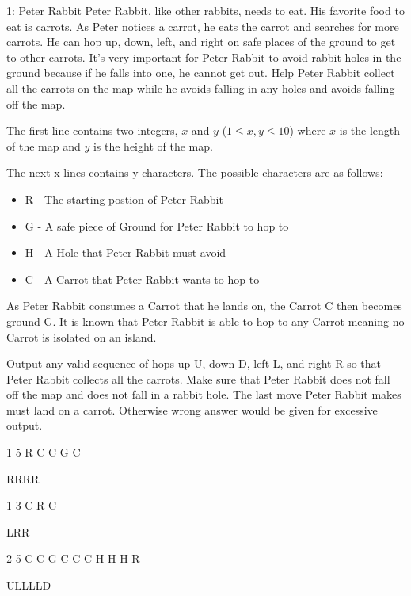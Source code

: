 \begin{problem}{1: Peter Rabbit}
Peter Rabbit, like other rabbits, needs to eat. His favorite food to eat is carrots.
As Peter notices a carrot, he eats the carrot and searches for more carrots.
He can hop up, down, left, and right on safe places of the ground to get to other carrots.
It's very important for Peter Rabbit to avoid rabbit holes in the ground because if he falls into one, he cannot get out.
Help Peter Rabbit collect all the carrots on the map while he avoids falling in any holes and avoids falling off the map.
\end{problem}

\begin{formalin}
The first line contains two integers, $x$ and $y$ ($1 \leq x, y \leq 10$) where $x$ is the length of the map and $y$ is the height of the map.

The next x lines contains y characters. The possible characters are as follows:
\begin{itemize}
\item R - The starting postion of Peter Rabbit
\item G - A safe piece of Ground for Peter Rabbit to hop to
\item H - A Hole that Peter Rabbit must avoid
\item C - A Carrot that Peter Rabbit wants to hop to
\end{itemize}

As Peter Rabbit consumes a Carrot that he lands on, the Carrot C then becomes ground G.
It is known that Peter Rabbit is able to hop to any Carrot meaning no Carrot is isolated on an island.
\end{formalin}

\begin{formalout}
Output any valid sequence of hops up U, down D, left L, and right R so that Peter Rabbit collects all the carrots.
Make sure that Peter Rabbit does not fall off the map and does not fall in a rabbit hole.
The last move Peter Rabbit makes must land on a carrot. Otherwise wrong answer would be given for excessive output.
\end{formalout}

\begin{datain}
1 5
R C C G C
\end{datain}
\begin{dataout}
RRRR
\end{dataout}

\begin{datain}
1 3
C R C
\end{datain}
\begin{dataout}
LRR
\end{dataout}

\begin{datain}
2 5
C C G C C
C H H H R
\end{datain}
\begin{dataout}
ULLLLD
\end{dataout}
